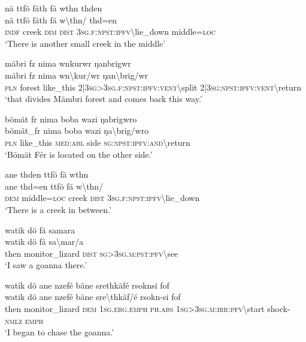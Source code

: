 \ea\label{ex:13:a1301}
nä ttfö fäth fä wthn thden\\
\gll nä	ttfö	fäth	fä	w{\textbackslash}thn/	thd=en\\
     \textsc{indf}	creek	\textsc{dim}	\textsc{dist}	3\textsc{sg}.\textsc{f}:\textsc{npst}:\textsc{ipfv}{\textbackslash}lie\_down	middle=\textsc{loc}\\
\glt `There is another small creek in the middle'
\z

\ea\label{ex:13:a1303}
mäbri fz nima wnkurwr ŋanbrigwr\\
\gll mäbri	fz	nima	wn{\textbackslash}kur/wr	ŋan{\textbackslash}brig/wr\\
     \textsc{pln}	forest	like\_this	2|3\textsc{sg}>3\textsc{sg}.\textsc{f}:\textsc{npst}:\textsc{ipfv}:\textsc{vent}{\textbackslash}split	2|3\textsc{sg}:\textsc{npst}:\textsc{ipfv}:\textsc{vent}{\textbackslash}return\\
\glt `that divides Mämbri forest and comes back this way.'
\z

\ea\label{ex:13:a1306}
bömät fr nima boba wazi ŋabrigwro\\
\gll bömät\_fr	nima	boba	wazi	ŋa{\textbackslash}brig/wro\\
     \textsc{pln}	like\_this	\textsc{med}:\textsc{abl}	side	\textsc{sg}:\textsc{npst}:\textsc{ipfv}:\textsc{and}{\textbackslash}return\\
\glt `Bömät Fér is located on the other side.'
\z

\ea\label{ex:13:a1307}
ane thden ttfö fä wthn\\
\gll ane	thd=en	ttfö	fä	w{\textbackslash}thn/\\
     \textsc{dem}	middle=\textsc{loc}	creek	\textsc{dist}	3\textsc{sg}.\textsc{f}:\textsc{npst}:\textsc{ipfv}{\textbackslash}lie\_down\\
\glt `There is a creek in between.'
\z

\ea\label{ex:13:a1308}
watik dö fä samara\\
\gll watik	dö	fä	sa{\textbackslash}mar/a\\
     then	monitor\_lizard	\textsc{dist}	\textsc{sg}>3\textsc{sg}.\textsc{m}:\textsc{pst}:\textsc{pfv}{\textbackslash}see\\
\glt `I saw a goanna there.'
\z

\newpage
\ea\label{ex:13:a1309}
watik dö ane nzefé bäne srethkäfé rsoknsi fof\\
\gll watik	dö	ane	nzefé	bäne	sre{\textbackslash}thkäf/é	rsokn-si	fof\\
     then	monitor\_lizard	\textsc{dem}	1\textsc{sg}.\textsc{erg}.\textsc{emph}	\textsc{ph}.\textsc{abs}	1\textsc{sg}>3\textsc{sg}.\textsc{m}:\textsc{irr}:\textsc{pfv}{\textbackslash}start	shock-\textsc{nmlz}	\textsc{emph}\\
\glt `I began to chase the goanna.'
\z

